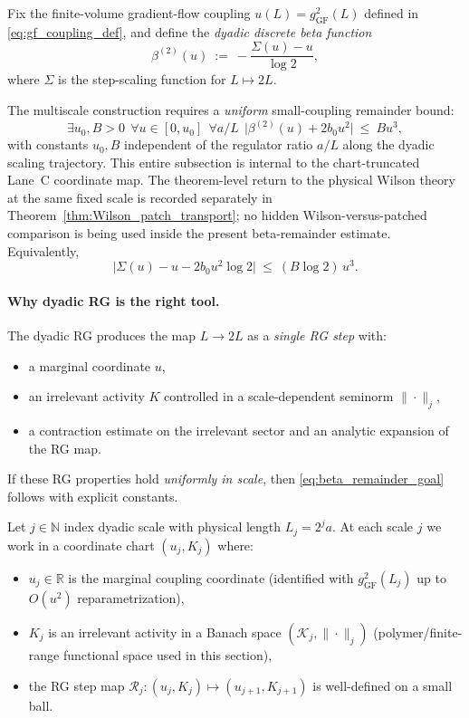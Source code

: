 Fix the finite-volume gradient-flow coupling $u(L)=g^2_{\mathrm{GF}}(L)$ defined in \eqref{eq:gf_coupling_def}, and define the \emph{dyadic discrete beta function}
\begin{equation}\label{eq:dyadic_beta_def}
\beta^{(2)}(u)\ :=\ -\frac{\Sigma(u)-u}{\log 2},
\end{equation}
where $\Sigma$ is the step-scaling function for $L\mapsto 2L$.

The multiscale construction requires a \emph{uniform} small-coupling remainder bound:
\begin{equation}
\exists u_0,B>0\ \ \forall u\in[0,u_0]\ \ \forall a/L\ \ 
\big|\beta^{(2)}(u)+2b_0 u^2\big|\ \le\ B u^3,
\end{equation}
with constants $u_0,B$ independent of the regulator ratio $a/L$ along the dyadic scaling trajectory.
This entire subsection is internal to the chart-truncated Lane~C coordinate map.
The theorem-level return to the physical Wilson theory at the same fixed scale is recorded separately in Theorem~\ref{thm:Wilson_patch_transport}; no hidden Wilson-versus-patched comparison is being used inside the present beta-remainder estimate.
Equivalently,
\begin{equation}
\big|\Sigma(u)-u-2b_0u^2\log 2\big|\ \le\ (B\log 2)\,u^3.
\end{equation}

\paragraph{Why dyadic RG is the right tool.}
The dyadic RG produces the map $L\to 2L$ as a \emph{single RG step} with:
\begin{itemize}
\item a marginal coordinate $u$,
\item an irrelevant activity $K$ controlled in a scale-dependent seminorm $\|\cdot\|_j$,
\item a contraction estimate on the irrelevant sector and an analytic expansion of the RG map.
\end{itemize}
If these RG properties hold \emph{uniformly in scale}, then \eqref{eq:beta_remainder_goal} follows with explicit constants.

Let $j\in\mathbb N$ index dyadic scale with physical length $L_j=2^j a$.
At each scale $j$ we work in a coordinate chart $(u_j,K_j)$ where:
\begin{itemize}
\item $u_j\in\mathbb R$ is the marginal coupling coordinate (identified with $g^2_{\mathrm{GF}}(L_j)$ up to $O(u^2)$ reparametrization),
\item $K_j$ is an irrelevant activity in a Banach space $(\mathscr K_j,\|\cdot\|_j)$ (polymer/finite-range functional space used in this section),
\item the RG step map $\mathcal R_j:(u_j,K_j)\mapsto (u_{j+1},K_{j+1})$ is well-defined on a small ball.
\end{itemize}


